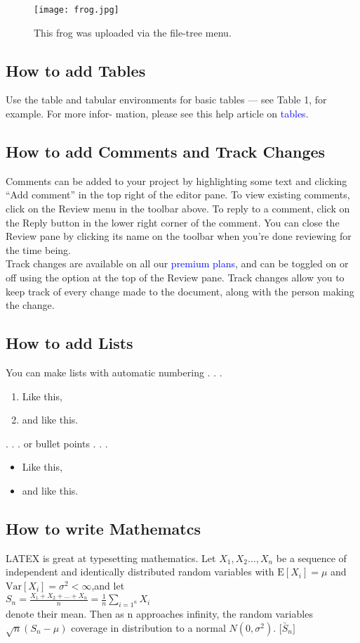 \documentclass{article}
\begin{document}
	\begin{figure}
		\centering
		\texttt{[image: frog.jpg]}
		\caption{This frog was uploaded via the file-tree menu.}
	\end{figure}
\vspace{5cm}

\subsection{ How to add Tables}
Use the table and tabular environments for basic tables — see Table 1, for example. For more infor-
mation, please see this help article on {\textcolor{blue}{tables}}.

\subsection{How to add Comments and Track Changes}
Comments can be added to your project by highlighting some text and clicking “Add comment” in
the top right of the editor pane. To view existing comments, click on the Review menu in the toolbar
above. To reply to a comment, click on the Reply button in the lower right corner of the comment.
You can close the Review pane by clicking its name on the toolbar when you’re done reviewing for the
time being.\\
Track changes are available on all our {\textcolor{blue}{premium plans}}, and can be toggled on or off using the option
at the top of the Review pane. Track changes allow you to keep track of every change made to the
document, along with the person making the change.

\subsection{How to add Lists}
You can make lists with automatic numbering . . .

\begin{enumerate}
		\item Like this,
		\item and like this.
\end{enumerate}
	. . . or bullet points . . .
\begin{itemize}
	\item Like this,
	\item and like this.	
\end{itemize}

\subsection{How to write Mathematcs}
LATEX is great at typesetting mathematics. Let $X_1,X_2\ldots,X_n$ be a sequence of independent and
identically distributed random variables with $\mathrm{E}[X_i]=\mu$ and $\mathrm{Var}[X_i]=\sigma^2 < \infty$,and let \\
$S_n=\frac{X_1+X_2+\ldots+X_n}{n}=\frac{1}{n}\sum_{i=1^n}X_i$
\\
denote their mean. Then as n approaches infinity, the random variables $\sqrt{n}(S_n - \mu)$ coverage in distribution to a normal $N(0,\sigma^2)$. $\mathrm[\bar S_n]$
\end{document}
